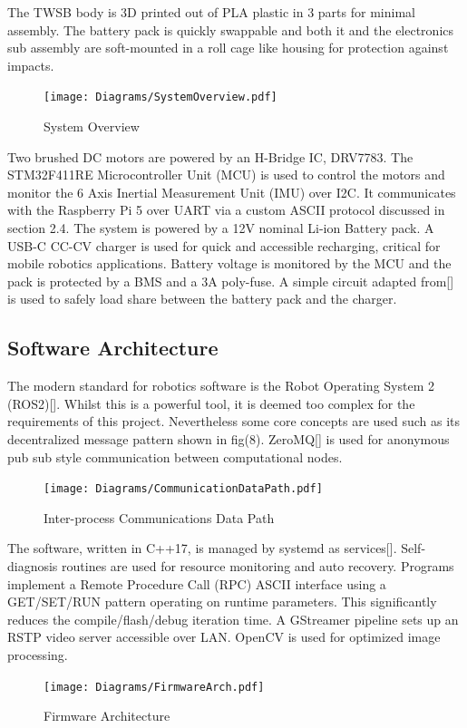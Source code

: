        The TWSB body is 3D printed out of PLA plastic in 3 parts for minimal assembly.
        The battery pack is quickly swappable and both it and the electronics sub assembly 
        are soft-mounted in a roll cage like housing for protection against impacts. 
        \begin{figure}[H]
            \centering
            \texttt{[image: Diagrams/SystemOverview.pdf]}
            \caption{System Overview}
        \end{figure}

        Two brushed DC motors are powered by an H-Bridge IC, DRV7783. 
        The STM32F411RE Microcontroller Unit (MCU) is used to control the 
        motors and monitor the 6 Axis Inertial Measurement Unit (IMU) over I2C. It communicates with the 
        Raspberry Pi 5 over UART via a custom ASCII protocol discussed in section 2.4. 
        The system is powered by a 12V nominal Li-ion Battery pack. A USB-C CC-CV charger is used for quick 
        and accessible recharging, critical for mobile robotics applications. 
        Battery voltage is monitored by the MCU and the pack is protected by a BMS and a 3A poly-fuse.
        A simple circuit adapted from[] is used to safely load share between the battery pack and the charger.

        \subsection{Software Architecture}
        The modern standard for robotics software is the Robot Operating System 2 (ROS2)[]. 
        Whilst this is a powerful tool, it is deemed too complex for the requirements of this project.
        Nevertheless some core concepts are used such as its 
        decentralized message pattern shown in fig(8). ZeroMQ[] is used for 
        anonymous pub sub style communication between computational nodes.
        \begin{figure} [H]
            \texttt{[image: Diagrams/CommunicationDataPath.pdf]}  
            \caption{Inter-process Communications Data Path}
        \end{figure}

        The software, written in C++17, is managed by systemd as services[]. 
        Self-diagnosis routines are used for resource monitoring and auto recovery. 
        Programs implement a Remote Procedure Call (RPC) ASCII interface using 
        a GET/SET/RUN pattern operating on runtime parameters. 
        This significantly reduces the compile/flash/debug iteration time. 
        A GStreamer pipeline sets up an RSTP video server accessible over LAN.
        OpenCV is used for optimized image processing.
        \begin{figure} [H]
            \texttt{[image: Diagrams/FirmwareArch.pdf]}
            \caption{Firmware Architecture}
        \end{figure}

